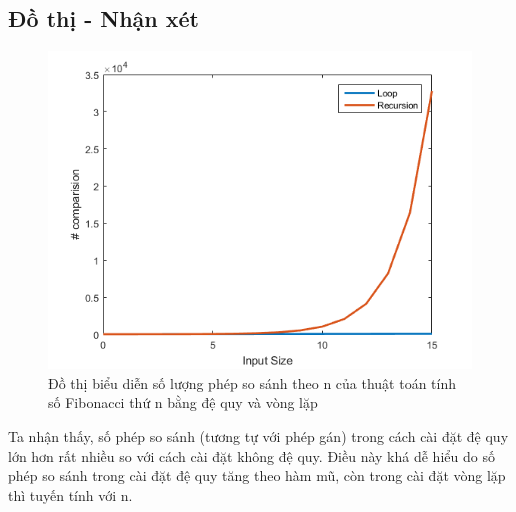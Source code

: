 \documentclass{article}
\begin{document}
\subsection{Đồ thị - Nhận xét}
\begin{figure}[H]
\includegraphics[scale = 1]{Graph}
\caption{Đồ thị biểu diễn số lượng phép so sánh theo n của thuật toán tính số Fibonacci thứ n bằng đệ quy và vòng lặp} 
\end{figure}
\begin{flushleft}
Ta nhận thấy, số phép so sánh (tương tự với phép gán) trong cách cài đặt đệ quy lớn hơn rất nhiều so với cách cài đặt không đệ quy. Điều này khá dễ hiểu do số phép so sánh trong cài đặt đệ quy tăng theo hàm mũ, còn trong cài đặt vòng lặp thì tuyến tính với n.
\end{flushleft}        
\end{document}
